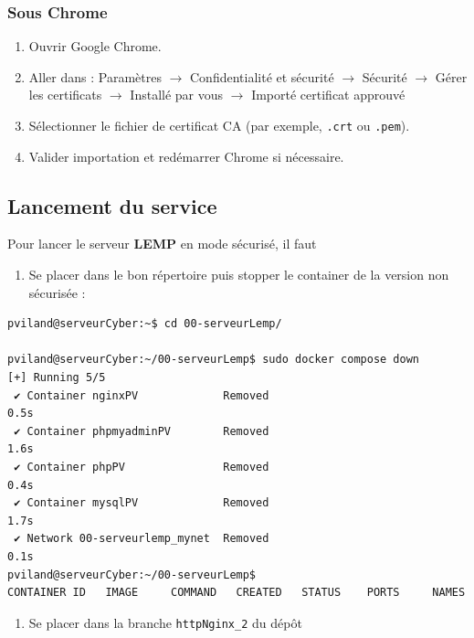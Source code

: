 \documentclass[french, 12pt]{article}%
\begin{document}
\subsubsection{Sous Chrome}
\begin{enumerate}
  \item Ouvrir Google Chrome.
  \item Aller dans : 
	Paramètres $\rightarrow$ Confidentialité et sécurité $\rightarrow$ Sécurité $\rightarrow$ Gérer les certificats   $\rightarrow$ Installé par vous  $\rightarrow$ Importé certificat approuvé
  \item Sélectionner le fichier de certificat CA (par exemple, \texttt{.crt} ou \texttt{.pem}).
  \item Valider importation et redémarrer Chrome si nécessaire.
\end{enumerate}

\subsection{Lancement du service}


Pour lancer le serveur \textbf{LEMP} en mode sécurisé, il faut 
\begin{enumerate}
\item Se placer dans le bon répertoire puis stopper le container de la version non sécurisée : 
\end{enumerate}

\begin{lstlisting}[style=commande]
pviland@serveurCyber:~$ cd 00-serveurLemp/

pviland@serveurCyber:~/00-serveurLemp$ sudo docker compose down
[+] Running 5/5
 ✔ Container nginxPV             Removed                                   0.5s 
 ✔ Container phpmyadminPV        Removed                                   1.6s 
 ✔ Container phpPV               Removed                                   0.4s 
 ✔ Container mysqlPV             Removed                                   1.7s 
 ✔ Network 00-serveurlemp_mynet  Removed                                   0.1s 
pviland@serveurCyber:~/00-serveurLemp$
CONTAINER ID   IMAGE     COMMAND   CREATED   STATUS    PORTS     NAMES
\end{lstlisting}


\begin{enumerate}[resume]
\item Se placer dans la branche \verb?httpNginx_2? du dépôt
\end{enumerate}
\end{document}
